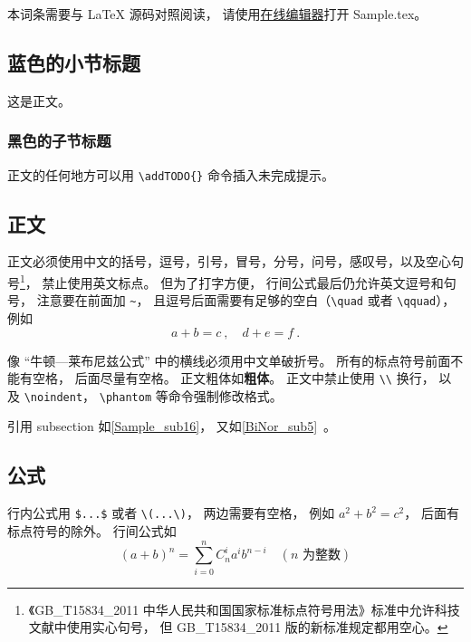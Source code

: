 
\begin{issues}
\issueDraft       %
\issueTODO        %
\issueMissDepend  %
\issueAbstract    %
\issueNeedCite    %
\end{issues}


本词条需要与 LaTeX 源码对照阅读， 请使用\href{https://wuli.wiki/editor}{在线编辑器}打开 Sample.tex。

\subsection{蓝色的小节标题}
这是正文。
\subsubsection{黑色的子节标题}
正文的任何地方可以用 \verb|\addTODO{}| 命令插入未完成提示。

\subsection{正文}\label{Sample_sub16}
正文必须使用中文的括号，逗号，引号，冒号，分号，问号，感叹号，以及空心句号\footnote{《GB\_T15834\_2011 中华人民共和国国家标准标点符号用法》标准中允许科技文献中使用实心句号， 但 GB\_T15834\_2011 版的新标准规定都用空心。}， 禁止使用英文标点。 但为了打字方便， 行间公式最后仍允许英文逗号和句号， 注意要在前面加 \verb|~|， 且逗号后面需要有足够的空白（\verb|\quad| 或者 \verb|\qquad|）， 例如
\begin{equation}\label{Sample_eq2}
a + b = c~, \quad d + e = f~.
\end{equation}

像 “牛顿—莱布尼兹公式” 中的横线必须用中文单破折号。 所有的标点符号前面不能有空格， 后面尽量有空格。 正文粗体如\textbf{粗体}。 正文中禁止使用 \verb|\\| 换行， 以及 \verb|\noindent|， \verb|\phantom| 等命令强制修改格式。

引用 subsection 如\autoref{Sample_sub16}， 又如\autoref{BiNor_sub5}~。

\subsection{公式}
行内公式用 \verb|$...$| 或者 \verb|\(...\)|， 两边需要有空格， 例如 $a^2+b^2=c^2$， 后面有标点符号的除外。 行间公式如
\begin{equation}\label{Sample_eq1}
(a+b)^n = \sum_{i=0}^n C_n^i a^i b^{n-i} \quad (\text{$n$ 为整数})
\end{equation}

